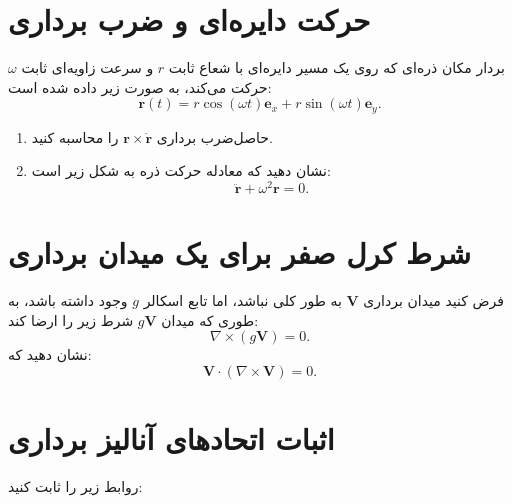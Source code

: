 \documentclass[a4paper,16pt]{article}
\begin{document}
	\medskip
	
	
	\section{حرکت دایره‌ای و ضرب برداری}
	
	بردار مکان ذره‌ای که روی یک مسیر دایره‌ای با شعاع ثابت
	\(r\) و سرعت زاویه‌ای ثابت \(\omega\) حرکت می‌کند،
	به صورت زیر داده شده است:
	\[
	\mathbf{r}(t)
	=
	r\cos(\omega t)\mathbf{e}_x
	+
	r\sin(\omega t)\mathbf{e}_y.
	\]
	
	\begin{enumerate}[label=\textbf{\alph*)}]
		\item حاصل‌ضرب برداری
		\(\mathbf{r}\times\dot{\mathbf{r}}\) را محاسبه کنید.
		
		\item نشان دهید که معادله حرکت ذره به شکل زیر است:
		\[
		\ddot{\mathbf{r}}+\omega^2\mathbf{r}=0.
		\]
	\end{enumerate}
	
	\medskip
	
	
	\section{شرط کرل صفر برای یک میدان برداری}
	
	فرض کنید میدان برداری \(\mathbf{V}\) به طور کلی
	 نباشد، اما تابع اسکالر \(g\) وجود داشته باشد،
	به طوری که میدان \(g\mathbf{V}\) شرط زیر را ارضا کند:
	\[
	\nabla\times(g\mathbf{V})=0.
	\]
	نشان دهید که:
	\[
	\mathbf{V}\cdot(\nabla\times\mathbf{V})=0.
	\]
	
	\medskip
	
	
	\section{اثبات اتحادهای آنالیز برداری}
	
	روابط زیر را ثابت کنید:
	
\end{document}
